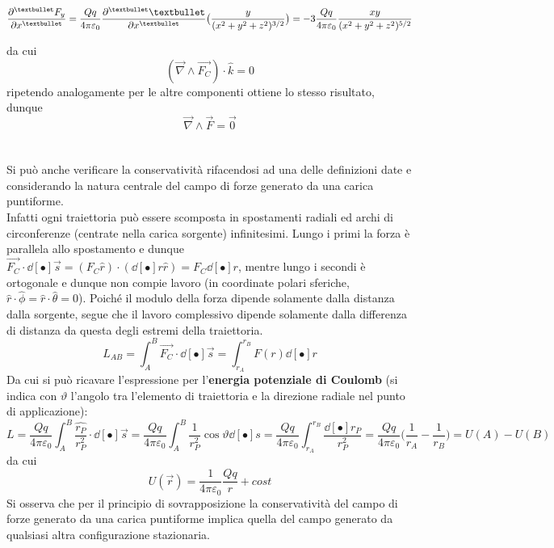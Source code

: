 \[ \pdv[•]{F_y}{x} = \frac{Qq}{4 \pi \varepsilon_0} \pdv[•]{•}{x} \big(\frac{y}{(x^2 + y^2 + z^2)^{3/2}}\big) = - 3 \frac{Qq}{4 \pi \varepsilon_0} \frac{xy}{(x^2 + y^2 + z^2)^{5/2}}\]

da cui
\[(\vec{\nabla} \wedge \vec{F_C}) \cdot \hat{k} = 0\]
ripetendo analogamente per le altre componenti ottiene lo stesso risultato, dunque
\[\vec{\nabla} \wedge \vec{F} = \vec{0}\]
\\~\\
Si può anche verificare la conservatività rifacendosi ad una delle definizioni date e considerando la natura centrale del campo di forze generato da una carica puntiforme.
\\Infatti ogni traiettoria può essere scomposta in spostamenti radiali ed archi di circonferenze (centrate nella carica sorgente) infinitesimi. Lungo i primi la forza è parallela allo spostamento e dunque $\vec{F_C} \cdot \dd[•]{\vec{s}} = (F_C \hat{r}) \cdot (\dd[•]{r} \hat{r}) = F_C \dd[•]{r}$, mentre lungo i secondi è ortogonale e dunque non compie lavoro (in coordinate polari sferiche, $\hat{r} \cdot \hat{\phi} = \hat{r} \cdot \hat{\theta} = 0$). Poiché il modulo della forza dipende solamente dalla distanza dalla sorgente, segue che il lavoro complessivo dipende solamente dalla differenza di distanza da questa degli estremi della traiettoria.
\[L_{AB} = \int_A^B \vec{F_C} \cdot \dd[•]{\vec{s}} = \int_{r_A}^{r_B} F(r) \dd[•]{r}\]
Da cui si può ricavare l'espressione per l'\textbf{energia potenziale di Coulomb} (si indica con $\vartheta$ l'angolo tra l'elemento di traiettoria e la direzione radiale nel punto di applicazione):
\[L = \frac{Qq}{4 \pi \varepsilon_0} \int_A^B \frac{\hat{r_P}}{r_P^2} \cdot \dd[•]{\vec{s}} = \frac{Qq}{4 \pi \varepsilon_0} \int_A^B \frac{1}{r_P^2} \cos \vartheta \dd[•]{s} =  \frac{Qq}{4 \pi \varepsilon_0} \int_{r_A}^{r_B} \frac{\dd[•]{r_P}}{r_P^2} = \frac{Qq}{4 \pi \varepsilon_0} \big(\frac{1}{r_A} - \frac{1}{r_B}\big) = U(A) - U(B)\]
da cui
\[U(\vec{r}) = \frac{1}{4 \pi \varepsilon_0} \frac{Qq}{r} + cost\]
Si osserva che per il principio di sovrapposizione la conservatività del campo di forze generato da una carica puntiforme implica quella del campo generato da qualsiasi altra configurazione stazionaria.

